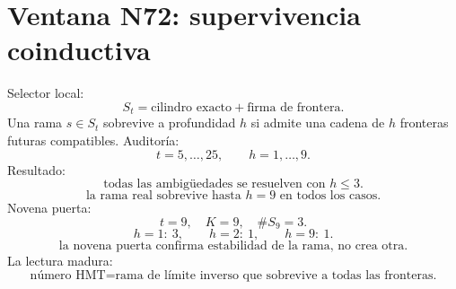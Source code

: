 
\section*{Ventana N72: supervivencia coinductiva}
Selector local:
\[
S_t=\text{cilindro exacto}+\text{firma de frontera}.
\]
Una rama \(s\in S_t\) sobrevive a profundidad \(h\) si admite una cadena de \(h\) fronteras futuras compatibles.
Auditoría:
\[
t=5,\ldots,25,\qquad h=1,\ldots,9.
\]
Resultado:
\[
\boxed{\text{todas las ambigüedades se resuelven con }h\le3.}
\]
\[
\boxed{\text{la rama real sobrevive hasta }h=9\text{ en todos los casos.}}
\]
Novena puerta:
\[
t=9,\quad K=9,\quad \#S_9=3.
\]
\[
h=1:\ 3,\qquad h=2:\ 1,\qquad h=9:\ 1.
\]
\[
\boxed{\text{la novena puerta confirma estabilidad de la rama, no crea otra.}}
\]
La lectura madura:
\[
\boxed{\text{número HMT}=\text{rama de límite inverso que sobrevive a todas las fronteras.}}
\]

